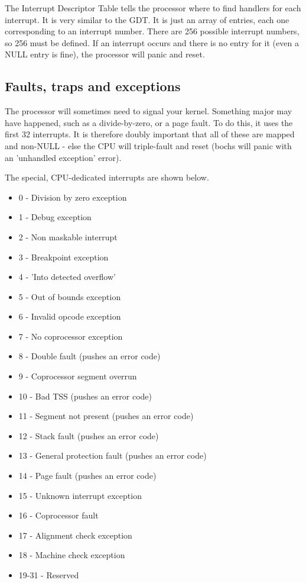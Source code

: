 \documentclass[12pt]{article}
\begin{document}
The Interrupt Descriptor Table tells the processor where to find handlers for each interrupt. It is very similar to the GDT. It is just an array of entries, each one corresponding to an interrupt number. There are 256 possible interrupt numbers, so 256 must be defined. If an interrupt occurs and there is no entry for it (even a NULL entry is fine), the processor will panic and reset.

\subsection{Faults, traps and exceptions}
The processor will sometimes need to signal your kernel. Something major may have happened, such as a divide-by-zero, or a page fault. To do this, it uses the first 32 interrupts. It is therefore doubly important that all of these are mapped and non-NULL - else the CPU will triple-fault and reset (bochs will panic with an 'unhandled exception' error).

The special, CPU-dedicated interrupts are shown below.
\begin{multicols}{2}
  \begin{itemize}
    \item 0 - Division by zero exception
    \item 1 - Debug exception
    \item 2 - Non maskable interrupt
    \item 3 - Breakpoint exception
    \item 4 - 'Into detected overflow'
    \item 5 - Out of bounds exception
    \item 6 - Invalid opcode exception
    \item 7 - No coprocessor exception
    \item 8 - Double fault (pushes an error code)
    \item 9 - Coprocessor segment overrun
    \item 10 - Bad TSS (pushes an error code)
    \item 11 - Segment not present (pushes an error code)
    \item 12 - Stack fault (pushes an error code)
    \item 13 - General protection fault (pushes an error code)
    \item 14 - Page fault (pushes an error code)
    \item 15 - Unknown interrupt exception
    \item 16 - Coprocessor fault
    \item 17 - Alignment check exception
    \item 18 - Machine check exception
    \item 19-31 - Reserved
  \end{itemize}
\end{multicols}
\end{document}
